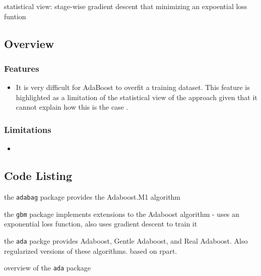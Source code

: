 statistical view: stage-wise gradient descent that minimizing an expoential loss funtion



\subsection{Overview}

\subsubsection{Features}

\begin{itemize}
	\item It is very difficult for AdaBoost to overfit a training dataset. This feature is highlighted as a limitation of the statistical view of the approach given that it cannot explain how this is the case \cite{Mease2008}.
\end{itemize}

\subsubsection{Limitations}

\begin{itemize}
	\item 
\end{itemize}


\subsection{Code Listing}



the \texttt{adabag} package provides the Adaboost.M1 algorithm \cite{Cortes2011}

the \texttt{gbm} package implements extensions to the Adaboost algorithm - uses an exponential loss function, also uses gradient descent to train it  \cite{Ridgeway2007a}

the \texttt{ada} packge provides Adaboost, Gentle Adaboost, and Real Adaboost. Also regularized versions of these algorithms. based on rpart.

overview of the \texttt{ada} package \cite{Culp2006}


